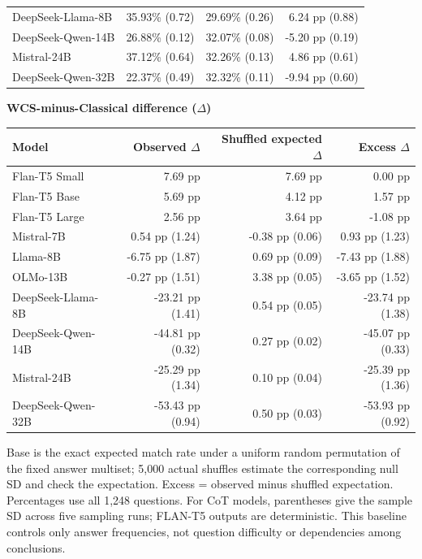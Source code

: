 \begin{table}[htbp]
\begin{tabular}{lrrr}
DeepSeek-Llama-8B & 35.93\% (0.72) & 29.69\% (0.26) & 6.24 pp (0.88) \\
DeepSeek-Qwen-14B & 26.88\% (0.12) & 32.07\% (0.08) & -5.20 pp (0.19) \\
Mistral-24B & 37.12\% (0.64) & 32.26\% (0.13) & 4.86 pp (0.61) \\
DeepSeek-Qwen-32B & 22.37\% (0.49) & 32.32\% (0.11) & -9.94 pp (0.60) \\
\bottomrule
\end{tabular}
\vspace{4pt}
\textbf{WCS-minus-Classical difference ($\Delta$)}
\begin{tabular}{lrrr}
\toprule
Model & Observed $\Delta$ & Shuffled expected $\Delta$ & Excess $\Delta$ \\
\midrule
Flan-T5 Small & 7.69 pp & 7.69 pp & 0.00 pp \\
Flan-T5 Base & 5.69 pp & 4.12 pp & 1.57 pp \\
Flan-T5 Large & 2.56 pp & 3.64 pp & -1.08 pp \\
Mistral-7B & 0.54 pp (1.24) & -0.38 pp (0.06) & 0.93 pp (1.23) \\
Llama-8B & -6.75 pp (1.87) & 0.69 pp (0.09) & -7.43 pp (1.88) \\
OLMo-13B & -0.27 pp (1.51) & 3.38 pp (0.05) & -3.65 pp (1.52) \\
DeepSeek-Llama-8B & -23.21 pp (1.41) & 0.54 pp (0.05) & -23.74 pp (1.38) \\
DeepSeek-Qwen-14B & -44.81 pp (0.32) & 0.27 pp (0.02) & -45.07 pp (0.33) \\
Mistral-24B & -25.29 pp (1.34) & 0.10 pp (0.04) & -25.39 pp (1.36) \\
DeepSeek-Qwen-32B & -53.43 pp (0.94) & 0.50 pp (0.03) & -53.93 pp (0.92) \\
\bottomrule
\end{tabular}
\vspace{2pt}
\begin{minipage}{\linewidth}
\scriptsize Base is the exact expected match rate under a uniform random permutation of the fixed answer multiset; 5,000 actual shuffles estimate the corresponding null SD and check the expectation. Excess = observed minus shuffled expectation. Percentages use all 1,248 questions. For CoT models, parentheses give the sample SD across five sampling runs; FLAN-T5 outputs are deterministic. This baseline controls only answer frequencies, not question difficulty or dependencies among conclusions.
\end{minipage}
\end{table}
